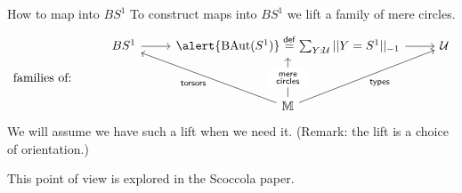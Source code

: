 \begin{frame}{How to map into \( BS^1 \)}
To construct maps into \( BS^1 \) we \alert{lift} a family of \alert{mere circles}.
\[\begin{tikzcd}[ampersand replacement=\&, row sep=small]
  \& {BS^1} \& {\alert{\BAut (S^1)}\stackrel{\mathrm{def}}{=}\sum_{Y:\uni}||Y=S^1||_{-1}} \& \uni \\
  {\text{families of:}} \\
  \&\& \mm
  \arrow[from=1-2, to=1-3]
  \arrow[from=1-3, to=1-4]
  \arrow["{\mathrm{torsors}}", from=3-3, to=1-2]
  \arrow["\begin{array}{c} \substack{\mathrm{mere}\\ \mathrm{circles}} \end{array}"{description}, from=3-3, to=1-3]
  \arrow["{\mathrm{types}}"', from=3-3, to=1-4]
\end{tikzcd}\]
We will assume we have such a lift when we need it. (Remark: the lift is a choice of \alert{orientation}.)

This point of view is explored in the Scoccola paper.

\end{frame}

